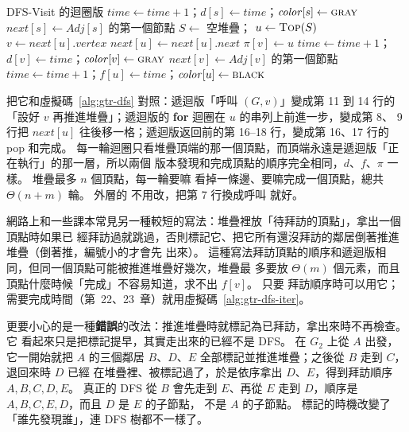 \begin{pseudo}[label=alg:gtr-dfs-iter]{DFS-Visit 的迴圈版}
    \State $\mathit{time} \gets \mathit{time} + 1$；$d[s] \gets \mathit{time}$；$\mathit{color}[s] \gets \textsc{gray}$
    \State $\mathit{next}[s] \gets \mathit{Adj}[s]$ 的第一個節點
    \State $S \gets$ 空堆疊；
        \State $u \gets \Call{Top}{S}$
         
            \State $v \gets \mathit{next}[u].\mathit{vertex}$
            \State $\mathit{next}[u] \gets \mathit{next}[u].\mathit{next}$
                \State $\pi[v] \gets u$
                \State $\mathit{time} \gets \mathit{time} + 1$；$d[v] \gets \mathit{time}$；$\mathit{color}[v] \gets \textsc{gray}$
                \State $\mathit{next}[v] \gets \mathit{Adj}[v]$ 的第一個節點
                \State {}
            \EndIf
        \Else {}
            \State {}
            \State $\mathit{time} \gets \mathit{time} + 1$；$f[u] \gets \mathit{time}$；$\mathit{color}[u] \gets \textsc{black}$
        \EndIf
    \EndWhile
\EndProcedure
\end{pseudo}

把它和虛擬碼~\ref{alg:gtr-dfs} 對照：遞迴版「呼叫 $(G, v)$」變成第 11 到
14 行的「設好 $v$ 再推進堆疊」；遞迴版的 \textbf{for} 迴圈在 $u$ 的串列上前進一步，變成第 8、
9 行把 $\mathit{next}[u]$ 往後移一格；遞迴版返回前的第 16--18 行，變成第 16、17 行的 pop
和完成。 每一輪迴圈只看堆疊頂端的那一個頂點，而頂端永遠是遞迴版「正在執行」的那一層，所以兩個
版本發現和完成頂點的順序完全相同，$d$、$f$、$\pi$ 一樣。 堆疊最多 $n$ 個頂點，每一輪要嘛
看掉一條邊、要嘛完成一個頂點，總共 $\Theta(n + m)$ 輪。 外層的  不用改，把第 7
行換成呼叫  就好。

網路上和一些課本常見另一種較短的寫法：堆疊裡放「待拜訪的頂點」，拿出一個頂點時如果已
經拜訪過就跳過，否則標記它、把它所有還沒拜訪的鄰居倒著推進堆疊（倒著推，編號小的才會先
出來）。 這種寫法拜訪頂點的順序和遞迴版相同，但同一個頂點可能被推進堆疊好幾次，堆疊最
多要放 $\Theta(m)$ 個元素，而且頂點什麼時候「完成」不容易知道，求不出 $f[v]$。 只要
拜訪順序時可以用它；需要完成時間（第~22、23~章）就用虛擬碼~\ref{alg:gtr-dfs-iter}。

更要小心的是一種\textbf{錯誤}的改法：推進堆疊時就標記為已拜訪，拿出來時不再檢查。 它
看起來只是把標記提早，其實走出來的已經不是 DFS。 在 $G_2$ 上從 $A$ 出發，它一開始就把
$A$ 的三個鄰居 $B$、$D$、$E$ 全部標記並推進堆疊；之後從 $B$ 走到 $C$，退回來時 $D$ 已經
在堆疊裡、被標記過了，於是依序拿出 $D$、$E$，得到拜訪順序 $A, B, C, D, E$。 真正的 DFS
從 $B$ 會先走到 $E$、再從 $E$ 走到 $D$，順序是 $A, B, C, E, D$，而且 $D$ 是 $E$ 的子節點，
不是 $A$ 的子節點。 標記的時機改變了「誰先發現誰」，連 DFS 樹都不一樣了。

